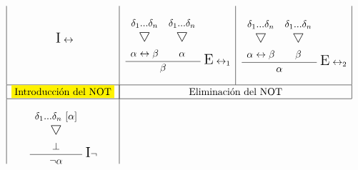 \documentclass[a4paper,12pt]{article}
\newcommand\triangulo{\scaleobj{1.3}{\bigtriangledown}}
\begin{document}
\begin{equation*}
\begin{array}{|c|c|c|}
\begin{matrix}
  \ \text{\Large I}\leftrightarrow \\
  \ 
\end{matrix}
&
\begin{matrix}
  \cfrac{
  \begin{matrix}
  \begin{array}{cc}
    \ \\
        \delta_1 ... \delta_n & \delta_1 ... \delta_n \\
        \triangulo & \triangulo \vspace{2mm}\\
        \alpha \leftrightarrow \beta & \alpha
      \end{array} \\
    \end{matrix}}{\beta}
  \ \text{\Large E}\leftrightarrow_1 \\
  \ 
\end{matrix}
&
\begin{matrix}
  \cfrac{
  \begin{matrix}
  \begin{array}{cc}
    \ \\
        \delta_1 ... \delta_n & \delta_1 ... \delta_n \\
        \triangulo & \triangulo \vspace{2mm}\\
        \alpha \leftrightarrow \beta & \beta
      \end{array} \\
    \end{matrix}}{\alpha}
  \ \text{\Large E}\leftrightarrow_2 \\
  \ 
\end{matrix}
\\ \hline
  \colorbox{yellow}{Introducción del NOT} & \multicolumn{2}{|c|}{\text{Eliminación del NOT}}
\\ \hline
\begin{matrix}
  \\
  \cfrac{
    \begin{matrix}
      \begin{array}{c}
        \delta_1 ... \delta_n \ [\alpha]\\
          \triangulo \vspace{2mm}\\
        \bot
      \end{array} \\
    \end{matrix}}{\neg \alpha}
  \ \text{\Large I} \neg
  \\

\end{matrix}
\end{array}
\end{equation*}
\end{document}
